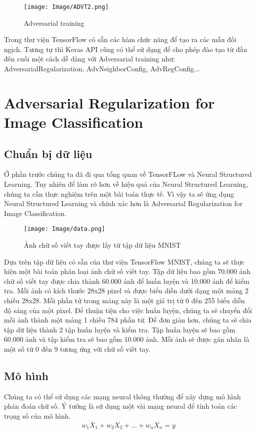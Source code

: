 \begin{figure}[h!]
    \centering
    \texttt{[image: Image/ADVT2.png]}
    \caption{Adversarial training}
    \label{Hình 2.6: Adversarial training}
    \cite*{Reference8}
\end{figure}

Trong thư viện TensorFlow có sẵn các hàm chức năng để tạo ra các mẫu đối ngịch. 
Tương tự thì Keras API cũng có thể sử dụng để cho phép đào tạo từ đầu đến cuối
một cách dễ dàng với Adversarial training như: AdversarialRegularization, AdvNeighborConfig, AdvRegConfig...

\section{Adversarial Regularization for Image Classification}
\subsection{Chuẩn bị dữ liệu}

Ở phần trước chúng ta đã đi qua tổng quan về TensorFLow và Neural Structured Learning. Tuy nhiên để làm rõ hơn về hiệu quả của Neural
Structured Learning, chúng ta cần thực nghiệm trên một bài toán thực tế. Vì vậy ta sẽ ứng dụng Neural Structured Learning và chính xác hơn là Adversarial 
Regularization for Image Classification.
\begin{figure}[h!]
    \centering
    \texttt{[image: Image/data.png]}
    \caption{Ảnh chữ số viết tay được lấy từ tập dữ liệu MNIST}
    \label{Hình 2.7: GẢnh chữ số viết tay được lấy từ tập dữ liệu MNIST}
\end{figure}


Dựa trên tập dữ liệu có sẵn của thư viện TensorFlow MNIST, chúng ta sẽ thực hiện một bài toán phân loại ảnh chữ số viết tay. Tập dữ liệu bao gồm 70.000 ảnh
chữ số viết tay được chia thành 60.000 ảnh để huấn luyện và 10.000 ảnh để kiểm tra. Mỗi ảnh có kích thước 28x28 pixel và được biểu diễn dưới dạng một mảng
2 chiều 28x28. Mỗi phần tử trong mảng này là một giá trị từ 0 đến 255 biểu diễn độ sáng của một pixel. Để thuận tiện cho việc huấn luyện, chúng ta sẽ chuyển đổi
mỗi ảnh thành một mảng 1 chiều 784 phần tử. Để đơn giản hơn, chúng ta sẽ chia tập dữ liệu thành 2 tập huấn luyện và kiểm tra. Tập huấn luyện sẽ bao gồm 60.000 ảnh 
và tập kiểm tra sẽ bao gồm 10.000 ảnh. Mỗi ảnh sẽ được gán nhãn là một số từ 0 đến 9 tương ứng với chữ số viết tay. 

\subsection{Mô hình}
Chúng ta có thể sử dụng các mạng neural thông thường để xây dựng mô hình phán đoán chữ số. Ý tưởng là sử dụng một vài mạng neural để tính toán các trọng số
của mô hình. 
\begin{equation}
    \begin{aligned}  
      w_1X_1 + w_2X_2 + ... + w_nX_n = y\\
    \end{aligned}
\end{equation}

